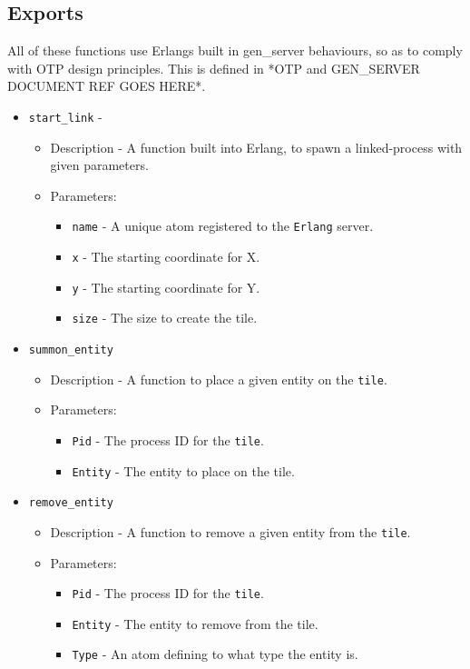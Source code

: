 \subsection{Exports}
All of these functions use Erlangs built in gen\_server behaviours, so as to comply with OTP design principles. This is defined in *OTP and GEN\_SERVER DOCUMENT REF GOES HERE*.
\begin{itemize}
	\item {\tt start\_link} - 
		\begin{itemize}
			\item Description - A function built into Erlang, to spawn a linked-process with given parameters.
			\item Parameters:
				\begin{itemize}
					\item {\tt name} - A unique atom registered to the \verb+Erlang+ server.
					\item {\tt x} - The starting coordinate for X.
					\item {\tt y} - The starting coordinate for Y.
					\item {\tt size} - The size to create the tile.
				\end{itemize}
		\end{itemize}

	\item {\tt summon\_entity}
		\begin{itemize}
			\item Description - A function to place a given entity on the \verb+tile+.
			\item Parameters:
				\begin{itemize}
					\item {\tt Pid} - The process ID for the \verb+tile+.
					\item {\tt Entity} - The entity to place on the tile.
				\end{itemize}
		\end{itemize}

	\item {\tt remove\_entity}
		\begin{itemize}
			\item Description - A function to remove a given entity from the \verb+tile+.
			\item Parameters:
				\begin{itemize}
					\item {\tt Pid} - The process ID for the \verb+tile+.
					\item {\tt Entity} - The entity to remove from the tile.
					\item {\tt Type} - An atom defining to what type the entity is.
				\end{itemize}
		\end{itemize}


\end{itemize}
